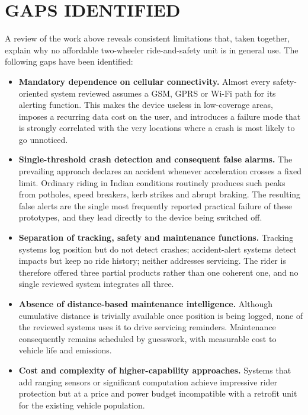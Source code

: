 \documentclass[12pt,a4paper,oneside]{report}
\begin{document}
\section{GAPS IDENTIFIED}

A review of the work above reveals consistent limitations that, taken together, explain why
no affordable two-wheeler ride-and-safety unit is in general use. The following gaps have
been identified:

\begin{itemize}[leftmargin=*,itemsep=0.6em,topsep=0.7em]
\item \textbf{Mandatory dependence on cellular connectivity.} Almost every safety-oriented
system reviewed assumes a GSM, GPRS or Wi-Fi path for its alerting function. This makes the
device useless in low-coverage areas, imposes a recurring data cost on the user, and
introduces a failure mode that is strongly correlated with the very locations where a crash
is most likely to go unnoticed.

\item \textbf{Single-threshold crash detection and consequent false alarms.} The prevailing
approach declares an accident whenever acceleration crosses a fixed limit. Ordinary riding
in Indian conditions routinely produces such peaks from potholes, speed breakers, kerb
strikes and abrupt braking. The resulting false alerts are the single most frequently
reported practical failure of these prototypes, and they lead directly to the device being
switched off.

\item \textbf{Separation of tracking, safety and maintenance functions.} Tracking systems
log position but do not detect crashes; accident-alert systems detect impacts but keep no
ride history; neither addresses servicing. The rider is therefore offered three partial
products rather than one coherent one, and no single reviewed system integrates all three.

\item \textbf{Absence of distance-based maintenance intelligence.} Although cumulative
distance is trivially available once position is being logged, none of the reviewed systems
uses it to drive servicing reminders. Maintenance consequently remains scheduled by
guesswork, with measurable cost to vehicle life and emissions.

\item \textbf{Cost and complexity of higher-capability approaches.} Systems that add ranging
sensors or significant computation achieve impressive rider protection but at a price and
power budget incompatible with a retrofit unit for the existing vehicle population.


\end{itemize}
\end{document}
